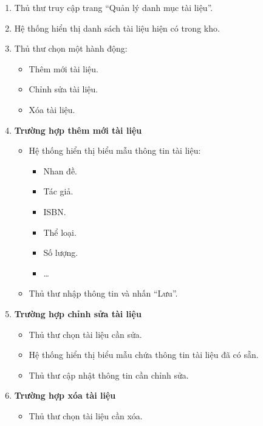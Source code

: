 \begin{enumerate}
    \item Thủ thư truy cập trang ``Quản lý danh mục tài liệu''.
    
    \item Hệ thống hiển thị danh sách tài liệu hiện có trong kho.
    
    \item Thủ thư chọn một hành động:
    \begin{itemize}
        \item Thêm mới tài liệu.
        \item Chỉnh sửa tài liệu.
        \item Xóa tài liệu.
    \end{itemize}

    \item \textbf{Trường hợp thêm mới tài liệu}
    \begin{itemize}
        \item Hệ thống hiển thị biểu mẫu thông tin tài liệu:
        \begin{itemize}
            \item Nhan đề.
            \item Tác giả.
            \item ISBN.
            \item Thể loại.
            \item Số lượng.
            \item \ldots
        \end{itemize}
        
        \item Thủ thư nhập thông tin và nhấn ``Lưu''.
    \end{itemize}

    \item \textbf{Trường hợp chỉnh sửa tài liệu}
    \begin{itemize}
        \item Thủ thư chọn tài liệu cần sửa.
        
        \item Hệ thống hiển thị biểu mẫu chứa thông tin tài liệu đã có sẵn.
        
        \item Thủ thư cập nhật thông tin cần chỉnh sửa.
    \end{itemize}

    \item \textbf{Trường hợp xóa tài liệu}
    \begin{itemize}
        \item Thủ thư chọn tài liệu cần xóa.
        

\end{itemize}
\end{enumerate}
